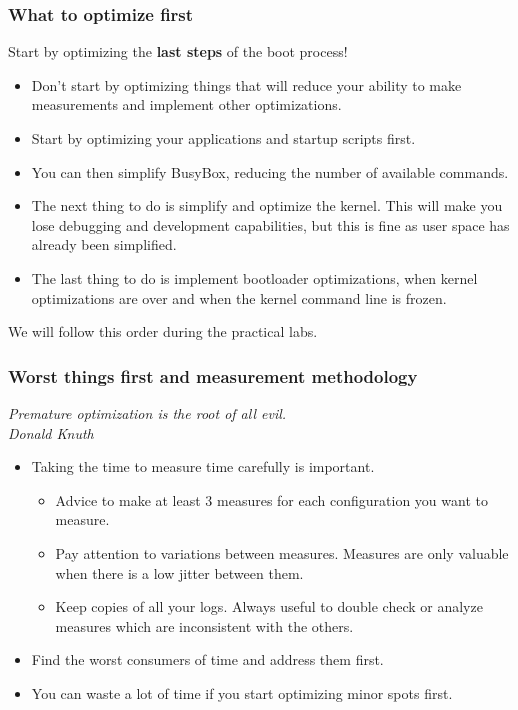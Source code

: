\begin{frame}
\frametitle{What to optimize first}
Start by optimizing the {\bf last steps} of the boot process!
\begin{itemize}
\item Don't start by optimizing things that will reduce your ability to
      make measurements and implement other optimizations.
\item Start by optimizing your applications and startup
      scripts first.
\item You can then simplify BusyBox, reducing the number of available
      commands.
\item The next thing to do is simplify and optimize the kernel. This
      will make you lose debugging and development capabilities,
      but this is fine as user space has already been simplified.
\item The last thing to do is implement bootloader optimizations,
      when kernel optimizations are over and when the kernel command
      line is frozen.
\end{itemize}
We will follow this order during the practical labs.
\end{frame}

\begin{frame}
\frametitle{Worst things first and measurement methodology}
{\em Premature optimization is the root of all evil.\\
Donald Knuth}
\begin{itemize}
\item Taking the time to measure time carefully is important.
      \begin{itemize}
           \item Advice to make at least 3 measures for each
		 configuration you want to measure.
           \item Pay attention to variations between measures.
		 Measures are only valuable when there is a low
		 jitter between them.
           \item Keep copies of all your logs. Always useful to
		 double check or analyze measures which are
                 inconsistent with the others.
      \end{itemize}
\item Find the worst consumers of time and address them first.
\item You can waste a lot of time if you start optimizing
      minor spots first.
\end{itemize}
\end{frame}

